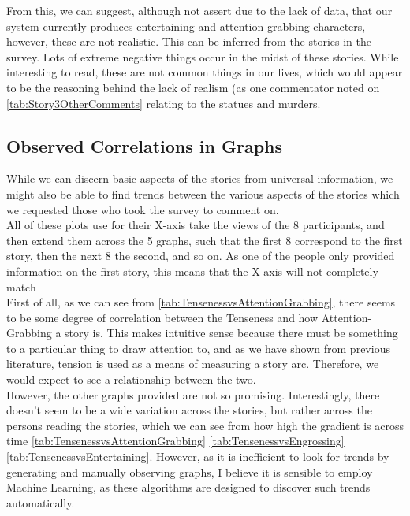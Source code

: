 \documentclass[12pt]{article}
\begin{document}
From this, we can suggest, although not assert due to the lack of data, that our system currently produces entertaining and attention-grabbing characters, however, these are not realistic. This can be inferred from the stories in the survey. Lots of extreme negative things occur in the midst of these stories. While interesting to read, these are not common things in our lives, which would appear to be the reasoning behind the lack of realism (as one commentator noted on \ref{tab:Story3OtherComments} relating to the statues and murders. \\


\subsection{Observed Correlations in Graphs}
While we can discern basic aspects of the stories from universal information, we might also be able to find trends between the various aspects of the stories which we requested those who took the survey to comment on. \\

All of these plots use for their X-axis take the views of the 8 participants, and then extend them across the 5 graphs, such that the first 8 correspond to the first story, then the next 8 the second, and so on. As one of the people only provided information on the first story, this means that the X-axis will not completely match\\

First of all, as we can see from \ref{tab:TensenessvsAttentionGrabbing}, there seems to be some degree of correlation between the Tenseness and how Attention-Grabbing a story is. This makes intuitive sense because there must be something to a particular thing to draw attention to, and as we have shown from previous literature, tension is used as a means of measuring a story arc. Therefore, we would expect to see a relationship between the two.\\

However, the other graphs provided are not so promising. Interestingly, there doesn't seem to be a wide variation across the stories, but rather across the persons reading the stories, which we can see from how high the gradient is across time \ref{tab:TensenessvsAttentionGrabbing} \ref{tab:TensenessvsEngrossing} \ref{tab:TensenessvsEntertaining}. However, as it is inefficient to look for trends by generating and manually observing graphs, I believe it is sensible to employ Machine Learning, as these algorithms are designed to discover such trends automatically. \\
\end{document}
